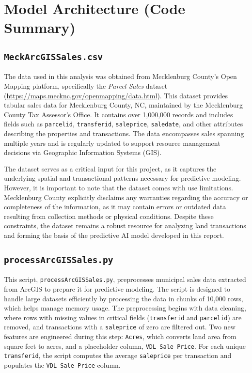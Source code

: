 \section{Model Architecture (Code Summary)}

\subsection{\texttt{MeckArcGISSales.csv}}

The data used in this analysis was obtained from Mecklenburg County’s Open Mapping platform, specifically the \textit{Parcel Sales} dataset (\url{https://maps.mecknc.gov/openmapping/data.html}). This dataset provides tabular sales data for Mecklenburg County, NC, maintained by the Mecklenburg County Tax Assessor’s Office. It contains over 1,000,000 records and includes fields such as \texttt{parcelid}, \texttt{transferid}, \texttt{saleprice}, \texttt{saledate}, and other attributes describing the properties and transactions. The data encompasses sales spanning multiple years and is regularly updated to support resource management decisions via Geographic Information Systems (GIS). 

The dataset serves as a critical input for this project, as it captures the underlying spatial and transactional patterns necessary for predictive modeling. However, it is important to note that the dataset comes with use limitations. Mecklenburg County explicitly disclaims any warranties regarding the accuracy or completeness of the information, as it may contain errors or outdated data resulting from collection methods or physical conditions. Despite these constraints, the dataset remains a robust resource for analyzing land transactions and forming the basis of the predictive AI model developed in this report.

\subsection{\texttt{processArcGISSales.py}}
This script, \texttt{processArcGISSales.py}, preprocesses municipal sales data extracted from ArcGIS to prepare it for predictive modeling. The script is designed to handle large datasets efficiently by processing the data in chunks of 10,000 rows, which helps manage memory usage. The preprocessing begins with data cleaning, where rows with missing values in critical fields (\texttt{transferid} and \texttt{parcelid}) are removed, and transactions with a \texttt{saleprice} of zero are filtered out. Two new features are engineered during this step: \texttt{Acres}, which converts land area from square feet to acres, and a placeholder column, \texttt{VDL Sale Price}. For each unique \texttt{transferid}, the script computes the average \texttt{saleprice} per transaction and populates the \texttt{VDL Sale Price} column.

